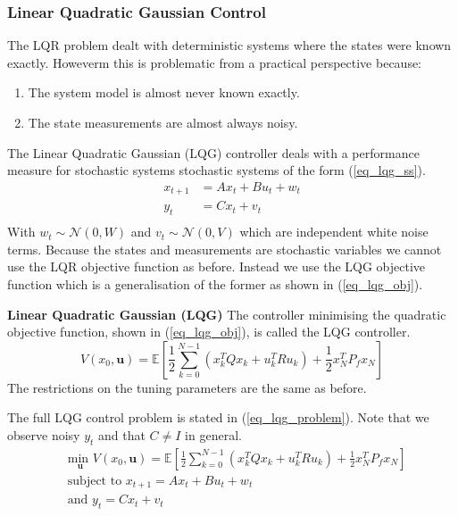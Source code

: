 \documentclass[../masters.tex]{subfiles}
\begin{document}
\subsubsection{Linear Quadratic Gaussian Control}
The LQR problem dealt with deterministic systems where the states were known exactly. Howeverm this is problematic from a practical perspective because:
\begin{enumerate}
\item
The system model is almost never known exactly.
\item
The state measurements are almost always noisy.
\end{enumerate}
The Linear Quadratic Gaussian (LQG) controller deals with a performance measure for stochastic systems stochastic systems of the form (\ref{eq_lqg_ss}).
\begin{equation}
\begin{aligned}
x_{t+1} &= Ax_t+ Bu_t + w_t \\
y_t &= Cx_t +v_t \\
\end{aligned}
\label{eq_lqg_ss}
\end{equation}
With  $w_t \sim \mathcal{N}(0, W)$ and $v_t \sim \mathcal{N}(0, V)$ which are independent white noise terms. 
Because the states and measurements are stochastic variables we cannot use the LQR objective function as before. Instead we use the LQG objective function which is a generalisation of the former as shown in (\ref{eq_lqg_obj}).
\begin{defn}
\textbf{Linear Quadratic Gaussian (LQG)} The controller minimising the quadratic objective function, shown in (\ref{eq_lqg_obj}), is called the LQG controller. 
\begin{equation}
V(x_0, \mathbf{u}) = \mathbb{E}\left[ \frac{1}{2}\sum_{k=0}^{N-1} \left( x_k^TQx_k + u_k^TRu_k \right) + \frac{1}{2}x_N^TP_fx_N \right]
\label{eq_lqg_obj}
\end{equation}
The restrictions on the tuning parameters are the same as before.
\end{defn}
The full LQG control problem is stated in (\ref{eq_lqg_problem}). Note that we observe noisy $y_t$ and that $C \neq I$ in general.
\begin{equation}
\begin{aligned}
&\underset{\mathbf{u}}{\text{min }} V(x_0, \mathbf{u}) = \mathbb{E}\left[ \frac{1}{2}\sum_{k=0}^{N-1} \left( x_k^TQx_k + u_k^TRu_k \right) + \frac{1}{2}x_N^TP_fx_N \right] \\
& \text{subject to } x_{t+1}=Ax_t+Bu_t + w_t \\
& \text{and } y_{t}= Cx_t + v_t \\
\end{aligned}
\label{eq_lqg_problem}
\end{equation}
\end{document}
